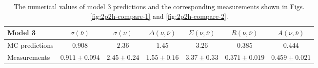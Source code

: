 \begin{table}
\caption{
\label{tab:show-model3} 
The numerical values of model 3 predictions and 
the corresponding measurements shown in Figs. \ref{fig:2p2h-compare-1} 
 and \ref{fig:2p2h-compare-2}.
}

\begin{tabular}{lcccccc}
\hline
\hline
Model 3 &  $\sigma(\overline{\nu})$ & $\sigma(\nu)$ & $\Delta(\nu,\overline{\nu})$ & $\Sigma(\nu,\overline{\nu})$ & $R(\nu,\overline{\nu})$ & $A(\nu,\overline{\nu})$ \\
\hline
MC predictions   & $0.908$ & $2.36$ & $1.45$ & $3.26$ & $0.385$ & $0.444$ \\
Measurements & $0.911\pm0.094$ & $2.45\pm0.24$ & $1.55\pm0.16$ & $3.37\pm0.33$ & $0.371\pm0.019$ & $0.459\pm0.021$ \\

\hline
\hline
\end{tabular}
\end{table}




